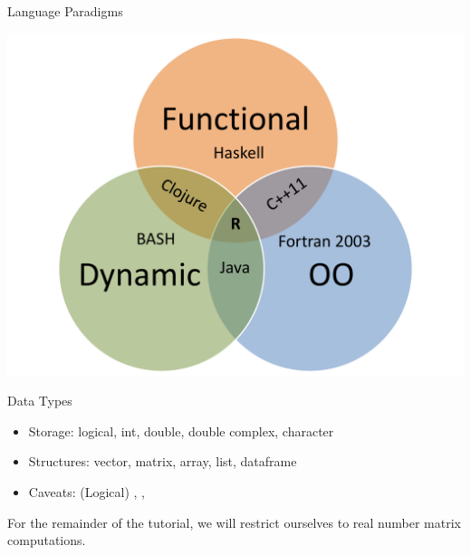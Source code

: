 \begin{frame}
  \begin{block}{Language Paradigms}\pause
  \begin{center}
    \includegraphics[scale=.35]{../common/pics/languages}
  \end{center}
  \end{block}
\end{frame}

\begin{frame}
  \begin{block}{Data Types}\pause
  \begin{itemize}[<+-|alert@+>]
    \item Storage:  logical, int, double, double complex, character
    \item Structures:  vector, matrix, array, list, dataframe
    \item Caveats:  (Logical) , , 
  \end{itemize}
  For the remainder of the tutorial, we will restrict ourselves to real number matrix computations.
\end{block}
\end{frame}




